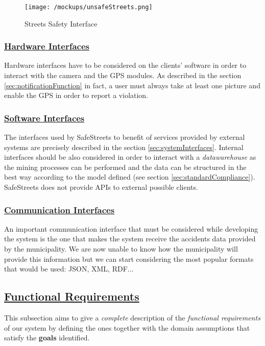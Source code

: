 	 \begin{figure}[h]
	 	\centering
	 	\begin{minipage}{0.7\textwidth}
	 		\centering
	 		\texttt{[image: /mockups/unsafeStreets.png]}
	 		\caption{Streets Safety Interface}
	 	\end{minipage}
	 \end{figure} 
 
	\FloatBarrier
	
	\subsubsection[Hardware Interfaces]{\hyperlink{toc}{Hardware Interfaces}}
		Hardware interfaces have to be considered on the clients' software in order to interact with the camera and the GPS modules. As described in the section \ref{sec:notificationFunction} in fact, a user must always take at least one picture and enable the GPS in order to report a violation. 
		
	\subsubsection[Software Interfaces]{\hyperlink{toc}{Software Interfaces}}
		The interfaces used by SafeStreets to benefit of services provided by external systems are precisely described in the section \ref{sec:systemInterfaces}. Internal interfaces should be also considered in order to interact with a \emph{datawarehouse} as the mining processes can be performed and the data can be structured in the best way according to the model defined (see section \ref{sec:standardCompliance}). SafeStreets does not provide APIs to external possible clients.
		
	\subsubsection[Communication Interfaces]{\hyperlink{toc}{Communication Interfaces}}
		An important communication interface that must be considered while developing the system is the one that makes the system receive the accidents data provided by the municipality. We are now unable to know how the municipality will provide this information but we can start considering the most popular formats that would be used: JSON, XML, RDF... 

\subsection[Functional Requirements]{\hyperlink{toc}{Functional Requirements}}
	\label{sec:functionalRequirements}
	This subsection aims to give a \emph{complete} description of the \emph{functional requirements} of our system by defining the ones together with the domain assumptions that satisfy the \textbf{goals} identified.
	
